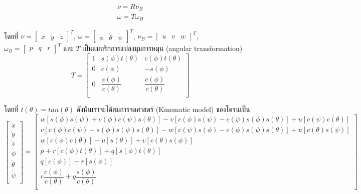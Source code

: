 \documentclass{classes/fiboReport}
\begin{document}
\begin{equation}
	\begin{array}{c}
		{\nu = R\nu_{B}}               \\
		{\omega = T\omega_{B}}         
		\label{equ:equation_of_motion} 
	\end{array}
\end{equation}

โดยที่ $\nu = [\begin{matrix}\dot{x} & \dot{y} & \dot{z} \end{matrix}]^T$, $\omega = [\begin{matrix}\dot\phi & \dot\theta & \dot\psi \end{matrix}]^T$,
$\nu_{B} = [\begin{matrix}u & v & w \end{matrix}]^T$, $\omega_{B} = [\begin{matrix}p & q & r \end{matrix}]^T$ และ $T$
เป็นแมทริกการแปลงมุมการหมุน (angular transformation)
\begin{equation}
	{T = \begin{bmatrix}
		1 & s(\phi)t(\theta) & c(\phi)t(\theta) \\
		0 & c(\phi) & -s(\phi) \\
		0 & \dfrac{s(\phi)}{c(\theta)}  & \dfrac{c(\phi)}{c(\theta)} \\
		\end{bmatrix}}
	\label{equ:angular_transformation}
\end{equation}

โดยที่ $t(\theta) = tan(\theta)$ ดังนั้นเราจะได้สมการจลศาสตร์ (Kinematic model) ของโดรนเป็น
\begin{equation}
	{\begin{bmatrix}
		\dot{x}  \\
		\dot{y}  \\
		\dot{z} \\
		\dot{\phi} \\
		\dot{\theta} \\
		\dot{\psi} \\
		\end{bmatrix} = 
		\begin{bmatrix}
			w[s(\phi)s(\psi)+c(\phi)c(\psi)s(\theta)]-v[c(\phi)s(\psi)-c(\psi)s(\phi)s(\theta)]+u[c(\psi)c(\theta)] \\
			v[c(\phi)c(\psi)+s(\phi)s(\psi)s(\theta)]-w[c(\psi)s(\phi)-c(\phi)s(\psi)s(\theta)]+u[c(\theta)s(\psi)] \\
			w[c(\phi)c(\theta)]-u[s(\theta)]+v[c(\theta)s(\phi)]                                                    \\
			p+r[c(\phi)t(\theta)]+q[s(\phi)t(\theta)]                                                               \\
			q[c(\phi)]-r[s(\phi)]                                                                                   \\
			r\dfrac{c(\phi)}{c(\theta)}+q\dfrac{s(\phi)}{c(\theta)}                                                 \\
		\end{bmatrix}	}
	\label{equ:kinematic model}
\end{equation}
\end{document}
